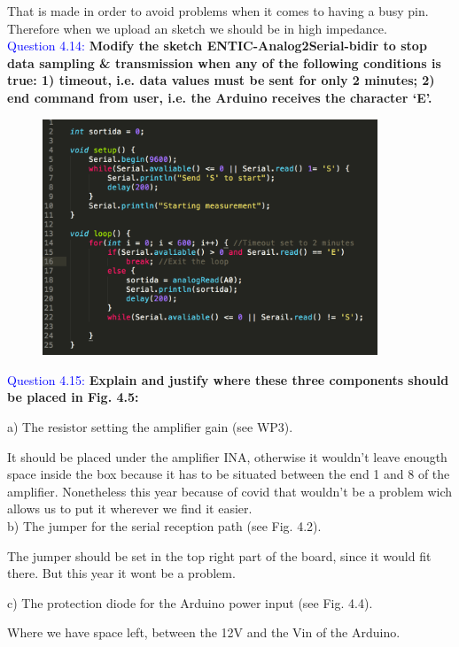 \documentclass[12pt, a4papre]{article}
\begin{document}
	That is made in order to avoid problems when it comes to having a busy pin. Therefore when we upload an sketch we should be in high impedance.\\

	\textcolor{blue}{Question 4.14:} \textbf{Modify the sketch ENTIC-Analog2Serial-bidir to stop data sampling \& transmission when any of the following conditions is true: 1) timeout, i.e. data values must be sent for only 2 minutes; 2) end command from user, i.e. the Arduino receives the character ‘E’.  }
	
	\begin{figure}[H]
		\begin{center}
		\includegraphics[width=100mm]{CodiCpp.png}
		\end{center}
	\end{figure}


	\textcolor{blue}{Question 4.15:} \textbf{Explain and justify where these three components should be placed in Fig. 4.5: }
	
	a)  The resistor setting the amplifier gain (see WP3).
	
	It should be placed under the amplifier INA, otherwise it wouldn't leave enougth space inside the box because it has to be situated between the end 1 and 8 of the amplifier. Nonetheless this year because of covid that wouldn't be a problem wich allows us to put it wherever we find it easier.\\
	
	b)  The jumper for the serial reception path (see Fig. 4.2).
	
	The jumper should be set in the top right part of the board, since it would fit there. But this year it wont be a problem.
	
	c)  The protection diode for the Arduino power input (see Fig. 4.4).
	
	Where we have space left, between the 12V and the Vin of the Arduino.
	
\end{document}
